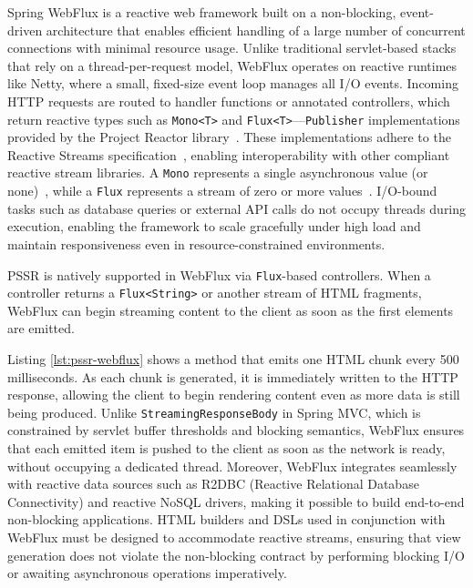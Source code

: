\documentclass[software,article,accept,pdftex,moreauthors]{Definitions/mdpi}
\begin{document}
Spring WebFlux is a reactive web framework built on a non-blocking,
event-driven architecture that enables efficient handling of a large number of
concurrent connections with minimal resource usage. Unlike traditional
servlet-based stacks that rely on a thread-per-request model, WebFlux operates
on reactive runtimes like Netty, where a small, fixed-size event loop manages
all I/O events. Incoming HTTP requests are routed to handler functions or
annotated controllers, which return reactive types such as \texttt{Mono<T>} and
\texttt{Flux<T>}---\texttt{Publisher} implementations provided by the Project
Reactor library~\cite{projectreactor}. These implementations adhere to the
Reactive Streams specification~\cite{ReactiveStreams}, enabling
interoperability with other compliant reactive stream libraries. A
\texttt{Mono} represents a single asynchronous value (or none)~\cite{promise},
while a \texttt{Flux} represents a stream of zero or more
values~\cite{rx-observable}. I/O-bound tasks such as
database queries or external API calls do not occupy threads during execution,
enabling the framework to scale gracefully under high load and maintain
responsiveness even in resource-constrained environments.

PSSR is natively supported in WebFlux via \texttt{Flux}-based controllers. When
a controller returns a \texttt{Flux<String>} or another stream of HTML
fragments, WebFlux can begin streaming content to the client as soon as the
first elements are emitted.


Listing \ref{lst:pssr-webflux} shows a method that emits one HTML chunk every 500 milliseconds. As
each chunk is generated, it is immediately written to the HTTP response,
allowing the client to begin rendering content even as more data is still being
produced. Unlike \texttt{StreamingResponseBody} in Spring MVC, which is
constrained by servlet buffer thresholds and blocking semantics, WebFlux
ensures that each emitted item is pushed to the client as soon as the network
is ready, without occupying a dedicated thread. Moreover, WebFlux integrates
seamlessly with reactive data sources such as R2DBC (Reactive Relational
Database Connectivity) and reactive NoSQL drivers, making it possible to build
end-to-end non-blocking applications. HTML builders and DSLs used in
conjunction with WebFlux must be designed to accommodate reactive streams,
ensuring that view generation does not violate the non-blocking contract by
performing blocking I/O or awaiting asynchronous operations imperatively.
\end{document}
